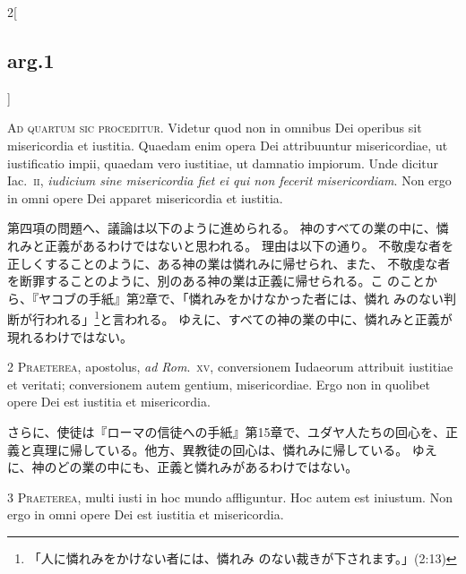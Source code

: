 \documentclass[paper=a4paper,fontsize=10pt,jafontsize=9pt,titlepage]{jlreq}
\begin{document}
\begin{paracol}{2}[\subsection{arg.1}]

{\Huge A}{\scshape d quartum sic proceditur}. Videtur quod non
in omnibus Dei operibus sit misericordia et iustitia. Quaedam enim opera
Dei attribuuntur misericordiae, ut iustificatio impii, quaedam vero
iustitiae, ut damnatio impiorum. Unde dicitur Iac.~{\scshape ii}, {\itshape iudicium sine
misericordia fiet ei qui non fecerit misericordiam}. Non ergo in omni
opere Dei apparet misericordia et iustitia.

\switchcolumn

第四項の問題へ、議論は以下のように進められる。
神のすべての業の中に、憐れみと正義があるわけではないと思われる。
理由は以下の通り。
不敬虔な者を正しくすることのように、ある神の業は憐れみに帰せられ、また、
 不敬虔な者を断罪することのように、別のある神の業は正義に帰せられる。こ
 のことから、『ヤコブの手紙』第2章で、「憐れみをかけなかった者には、憐れ
 みのない判断が行われる」\footnote{「人に憐れみをかけない者には、憐れみ
 のない裁きが下されます。」(2:13)}と言われる。
ゆえに、すべての神の業の中に、憐れみと正義が現れるわけではない。


{\scshape 2 Praeterea}, apostolus, {\itshape ad Rom}.~{\scshape xv},
conversionem Iudaeorum attribuit iustitiae et veritati; conversionem
autem gentium, misericordiae. Ergo non in quolibet opere Dei est
iustitia et misericordia.

\switchcolumn

さらに、使徒は『ローマの信徒への手紙』第15章で、ユダヤ人たちの回心を、正
 義と真理に帰している。他方、異教徒の回心は、憐れみに帰している。
ゆえに、神のどの業の中にも、正義と憐れみがあるわけではない。


{\scshape 3 Praeterea}, multi iusti in hoc mundo
affliguntur. Hoc autem est iniustum. Non ergo in omni opere Dei est
iustitia et misericordia.

\switchcolumn


\end{paracol}
\end{document}

